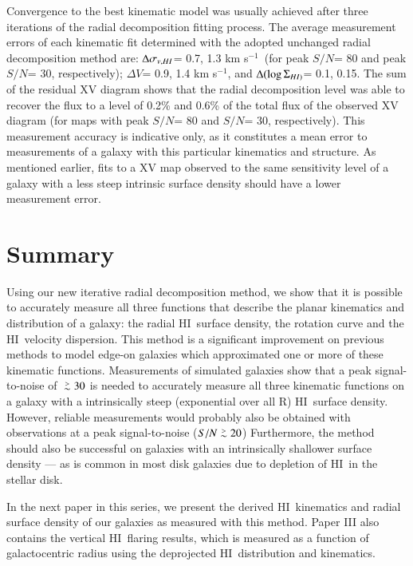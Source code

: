 \documentclass[traditabstract]{aa} %
\newcommand\gesim{\lower.5ex\hbox{$\; \buildrel > \over \sim \;$}}
\newcommand\HI{H{\small I}}
\newcommand\kms{km s$^{-1}$}
\begin{document}
Convergence to the best kinematic model was usually achieved after three
iterations of the radial decomposition fitting process.  The average
measurement errors of each kinematic fit determined with the adopted
unchanged radial decomposition method are: $\Delta \sigma_{v,\HI}$=
0.7, 1.3 \kms\ (for peak $S/N$= 80 and peak $S/N$= 30,
respectively); $\Delta V$= 0.9, 1.4 \kms,  and 
$\Delta (\log \Sigma_{\HI)}$= 0.1, 0.15. The sum
of the residual XV diagram shows that the radial decomposition level was able
to recover the flux to a level of 0.2\% and 0.6\% of the total
flux of the observed XV diagram (for maps with peak $S/N$= 80 and $S/N$= 30,
respectively). This measurement accuracy is indicative only, as it constitutes
a mean error to measurements of  a galaxy with this particular
kinematics and structure. As mentioned earlier, fits to a XV map observed to
the same sensitivity level of a galaxy with a less steep intrinsic
surface density should have a lower measurement error.

\section{Summary}

Using our new iterative radial decomposition method, we show that it is
possible to accurately measure all three functions that describe the
planar kinematics and distribution of a galaxy: the radial \HI\ surface
density, the rotation curve and the \HI\ velocity dispersion. This
method is a significant improvement on previous methods to model
edge-on galaxies which approximated one or more of these kinematic
functions. Measurements of simulated galaxies show that a peak
signal-to-noise of $\gesim 30$ is needed to accurately measure all
three kinematic functions on a galaxy with a intrinsically steep
(exponential over all R) \HI\ surface density. However, reliable 
measurements would probably also be obtained with observations at a 
peak signal-to-noise
($S/N \gesim 20$) Furthermore, the method should also be successful 
on galaxies with an intrinsically
shallower surface density --- as is common in most disk galaxies due to 
depletion of \HI\ in the stellar disk.

In the next paper in this series, we present the derived \HI\ kinematics 
and radial surface density of our galaxies as measured with this method. 
Paper III also contains the vertical \HI\ flaring results, which is measured 
as a function of galactocentric radius using the deprojected \HI\ distribution 
and kinematics. 
\end{document}
